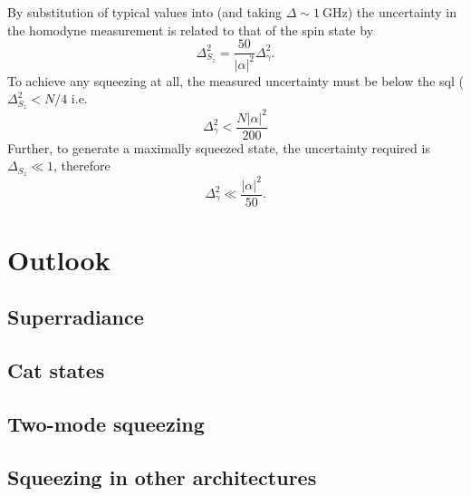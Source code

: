 By substitution of typical values into  (and
taking $\Delta\sim \SI{1}{\giga\hertz}$) the uncertainty in the homodyne
measurement is related to that of the spin state by
%
\begin{equation}
  \Delta_{S_z}^2 = \frac{50}{|\alpha|^2}\Delta_\gamma^2.
\end{equation}
%
To achieve any squeezing at all, the measured uncertainty must be below the
sql ($\Delta_{S_z}^2 < N/4$ %
i.e.~
%
\begin{equation}
  \Delta_\gamma^2 < \frac{N |\alpha|^2}{200}
\end{equation}
%
Further, to generate a maximally squeezed state, the uncertainty required is
$\Delta_{S_z}\ll1$, therefore
%
\begin{equation}
  \Delta_\gamma^2 \ll \frac{|\alpha|^2}{50}.
\end{equation}
%


\section{Outlook}


\subsection{Superradiance}

\subsection{Cat states}

\subsection{Two-mode squeezing}


\subsection{Squeezing in other architectures}

